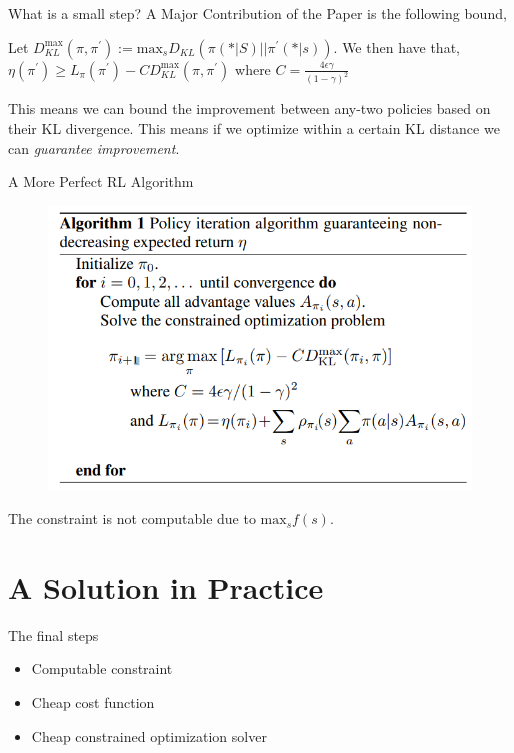 \documentclass{beamer}
\begin{document}
\begin{frame}{What is a small step?}
A Major Contribution of the Paper is the following bound, 

\begin{theorem}
Let $D_{KL}^{\text{max}}(\pi, \pi^\prime) := \text{max}_s D_{KL}\left(\pi(* \vert S) \vert\vert \pi^\prime(*\lvert s) \right).$ We then have that, 
$\eta(\pi^\prime) \geq L_{\pi}(\pi^\prime) - C D_{KL}^{\text{max}}(\pi, \pi^\prime)$ where $C = \frac{4 \epsilon \gamma}{(1-\gamma)^2}$
\end{theorem}
This  means we can bound the improvement between any-two policies based on their KL divergence. This means if we optimize within a certain KL distance we can \textit{guarantee improvement}. 
\end{frame}


\begin{frame}{A More Perfect RL Algorithm}
    \begin{figure}
        \centering
        \includegraphics[width=0.7\linewidth]{TRPO_algo .png}
        \label{fig:enter-label}
    \end{figure}

The constraint is not computable due to $\text{max}_{s} f(s)$.
\end{frame}

\section{A Solution in Practice}

\begin{frame}{The final steps}
    \begin{itemize}
        \item Computable constraint 
        \vspace{4pt}
        \item Cheap cost function 
        \vspace{4pt}
        \item Cheap constrained optimization solver
    \end{itemize}
    
\end{frame}
\end{document}
